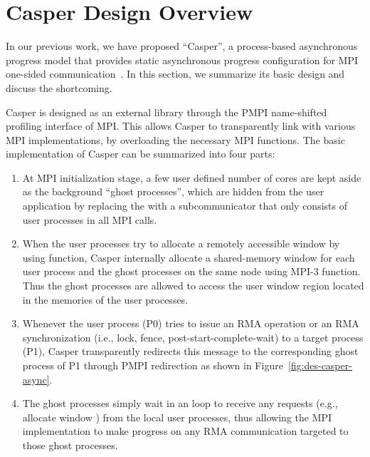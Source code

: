 \section{Casper Design Overview}\label{sec:des-basic}
In our previous work, we have proposed ``Casper'', a process-based
asynchronous progress model that provides static asynchronous progress
configuration for MPI one-sided communication~\cite{casper}.
In this section, we summarize its basic design and discuss the shortcoming.

Casper is designed as an external library through the PMPI name-shifted
profiling interface of MPI. This allows Casper to transparently link with
various MPI implementations, by overloading the necessary MPI functions.
The basic implementation of Casper can be summarized into four parts:
\begin{enumerate}
\item At MPI initialization stage, a few user defined number of cores are
kept aside as the background ``ghost processes'', which are hidden from
the user application by replacing the  with a
subcommunicator  that only consists of user processes
in all MPI calls.

\item When the user processes try to allocate a remotely accessible window
by using  function, Casper internally allocate a
shared-memory window for each user process and the ghost processes on
the same node using MPI-3  function. Thus
the ghost processes are allowed to access the user window region located
in the memories of the user processes.

\item Whenever the user process (P0) tries to issue an RMA operation or
an RMA synchronization (i.e., lock, fence, post-start-complete-wait) to
a target process (P1), Casper transparently redirects this message to
the corresponding ghost process of P1 through PMPI redirection as shown
in Figure~\ref{fig:des-casper-async}.

\item The ghost processes simply wait in an  loop to receive
any requests (e.g., allocate window ) from the local user processes, thus
allowing the MPI implementation to make progress on any RMA communication
targeted to those ghost processes.
\end{enumerate}

